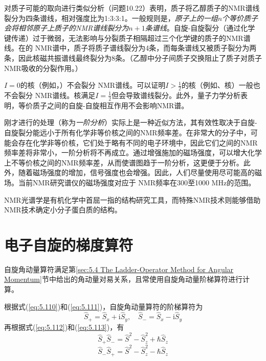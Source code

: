     对质子可能的取向进行类似分析（问题10.22）表明，质子将乙醇质子的NMR谱线裂分为四条谱线，相对强度比为1:3:3:1。一般规则是，\textit{原子上的一组$n$个等价质子会将相邻原子上质子的NMR谱线裂分为$n+1$条谱线}。自旋-自旋裂分（通过化学键传递）过于微弱，无法影响与分裂质子相隔超过三个化学键的质子的NMR谱线。在的 NMR谱中，质子将质子谱线裂分为4条，而每条谱线又被质子裂分为两条，因此核磁共振谱线最终裂分为8条。（乙醇中分子间质子交换阻止了质子对质子NMR吸收的分裂作用。）

    $I=0$的核（例如，）不会裂分 NMR谱线。可以证明$I > \frac{1}{2}$的核（例如、核）一般也不会裂分 NMR谱线。核满足$I = \frac{1}{2}$但会导致谱线裂分。此外，量子力学分析表明，等价质子之间的自旋-自旋相互作用不会影响NMR谱。

    刚才进行的处理（称为\textit{一阶分析}）实际上是一种近似方法，其有效性取决于自旋-自旋裂分能远小于所有化学非等价核之间的NMR频率差。在非常大的分子中，可能会存在化学非等价核，它们处于略有不同的电子环境中，因此它们之间的NMR频率差将非常小，一阶分析将不再成立。通过增强施加的磁场强度，可以增大化学上不等价核之间的NMR频率差，从而使谱图趋于一阶分析，这更便于分析。此外，随着磁场强度的增加，信号强度也会增强。因此，人们尽量使用尽可能高的磁场。当前NMR研究谱仪的磁场强度对应于 NMR频率在300至1000 MHz的范围。

    NMR光谱学是有机化学中首屈一指的结构研究工具，而特殊NMR技术则能够借助NMR技术确定小分子蛋白质的结构。

\section{电子自旋的梯度算符}
\label{sec:10.10 Ladder Operators for Electron Spin}

    自旋角动量算符满足第\ref{sec:5.4 The Ladder-Operator Method for Angular Momentum}节中给出的角动量对易关系，且常使用自旋角动量阶梯算符进行计算。

    根据式(\ref{eq:5.110})和(\ref{eq:5.111})，自旋角动量算符的阶梯算符为
    \begin{equation}
        \hat{S}_+ = \hat{S}_x + \mathrm{i}\hat{S}_y, \quad \hat{S}_- = \hat{S}_x - \mathrm{i}\hat{S}_y
        \label{eq:10.63}
    \end{equation}
    再根据式(\ref{eq:5.112})和(\ref{eq:5.113})，有
    \begin{equation}
        \hat{S}_+\hat{S}_- = \hat{S}^2 - \hat{S}_z^2 + \hbar\hat{S}_z
        \label{eq:10.64}
    \end{equation}
    \begin{equation}
        \hat{S}_-\hat{S}_+ = \hat{S}^2 - \hat{S}_z^2 - \hbar\hat{S}_z
        \label{eq:10.65}
    \end{equation}

